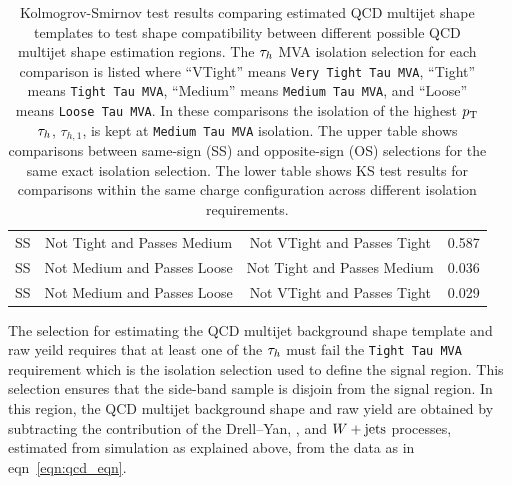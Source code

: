 \begin{table}[h!]
\begin{center}
{\begin{tabular}{|c|c|c|c|}
SS & Not Tight and Passes Medium & Not VTight and Passes Tight & 0.587 \\
SS & Not Medium and Passes Loose & Not Tight and Passes Medium & 0.036 \\
SS & Not Medium and Passes Loose & Not VTight and Passes Tight & 0.029 \\
\hline
\end{tabular}
}
\end{center}
\caption{
Kolmogrov-Smirnov test results comparing estimated QCD multijet shape templates to test shape compatibility
between different possible QCD multijet shape estimation regions. The $\tau_{h}$ MVA isolation selection
for each comparison is listed where ``VTight'' means \texttt{Very Tight Tau MVA}, ``Tight'' means \texttt{Tight Tau MVA},
``Medium'' means \texttt{Medium Tau MVA}, and ``Loose'' means \texttt{Loose Tau MVA}.
In these comparisons the isolation of the highest $p_\mathrm{T}$ $\tau_{h}$, $\tau_{h,1}$,
is kept at \texttt{Medium Tau MVA} isolation.  
The upper table shows comparisons between same-sign (SS) and opposite-sign (OS) selections for the same
exact isolation selection. The lower table shows KS test results for comparisons
within the same charge configuration across different isolation requirements.
}
\label{tab:htt_qcd_ks}
\end{table} 

The selection for estimating the QCD multijet background shape template and raw yeild requires 
that at least one of the $\tau_{h}$
must fail the \texttt{Tight Tau MVA} requirement which is the isolation selection used to 
define the signal region. This selection
ensures that the side-band sample is disjoin from the signal region.
In this region, the QCD multijet background shape and raw yield are obtained
by subtracting the contribution of the Drell--Yan, \ttbar, and $W+\text{jets}$ processes, 
estimated from simulation as explained above, from the data as in eqn~\ref{eqn:qcd_eqn}.

